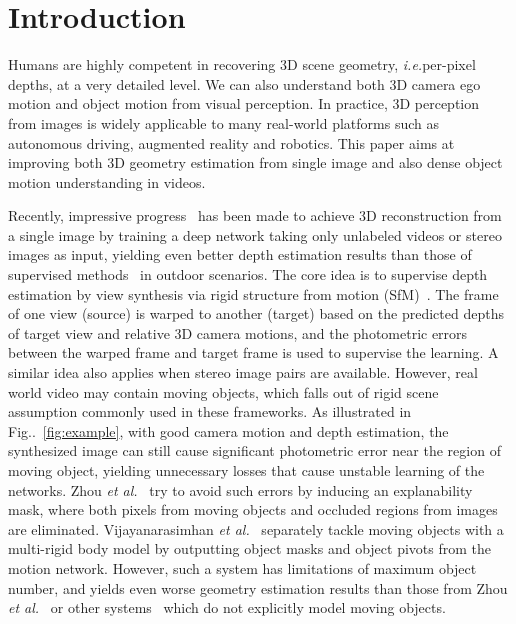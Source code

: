 \documentclass[runningheads]{llncs}
\makeatletter
\newcommand{\figref}[1]{Fig\onedot~\ref{#1}}
\DeclareRobustCommand\onedot{\futurelet\@let@token\@onedot}
\def\onedot{\ifx\@let@token.\else.\null\fi\xspace}
\def\ie{\emph{i.e.}}
\def\etal{\emph{et al.}}
\makeatother
\begin{document}
%
 \vspace{-0.6\baselineskip}
\section{Introduction}
\vspace{-0.1\baselineskip}
\label{sec:intro}

Humans are highly competent in recovering 3D scene geometry, \ie per-pixel depths, at a very detailed level. We can also understand both 3D camera ego motion and object motion from visual perception. 
In practice, 3D perception from images is widely applicable to many real-world platforms such as autonomous driving, augmented reality and robotics. This paper aims at improving both 3D geometry estimation from single image and also dense object motion understanding in videos.




Recently, impressive progress~\cite{godard2016unsupervised,zhou2017unsupervised,yang2018aaai,yang2018cvpr} has been made to achieve 3D reconstruction from a single image by training a deep network taking only unlabeled videos or stereo images as input, yielding even better depth estimation results than those of supervised methods~\cite{eigen2014depth} in outdoor scenarios.
The core idea is to supervise depth estimation by view synthesis via rigid structure from motion (SfM)~\cite{wu2011visualsfm}. The frame of one view (source) is warped to another (target) based on the predicted depths of target view and relative 3D camera motions, and the photometric errors between the warped frame and target frame is used to supervise the learning. A similar idea also applies when stereo image pairs are available.
However, real world video may contain moving objects, which falls out of rigid scene assumption commonly used in these frameworks. As illustrated in \figref{fig:example}, with good camera motion and depth estimation, the synthesized image can still cause significant photometric error near the region of moving object, yielding unnecessary losses that cause unstable learning of the networks. 
Zhou \etal~\cite{zhou2017unsupervised} try to avoid such errors by inducing an explanability mask, where both pixels from moving objects and occluded regions from images are eliminated. 
Vijayanarasimhan \etal~\cite{Vijayanarasimhan17} separately tackle moving objects with a multi-rigid body model by outputting  object masks and  object pivots from the motion network.
However, such a system has limitations of maximum object number, and yields even worse geometry estimation results than those from Zhou \etal~\cite{zhou2017unsupervised} or other systems~\cite{yang2018cvpr} which do not explicitly model moving objects.
\end{document}
